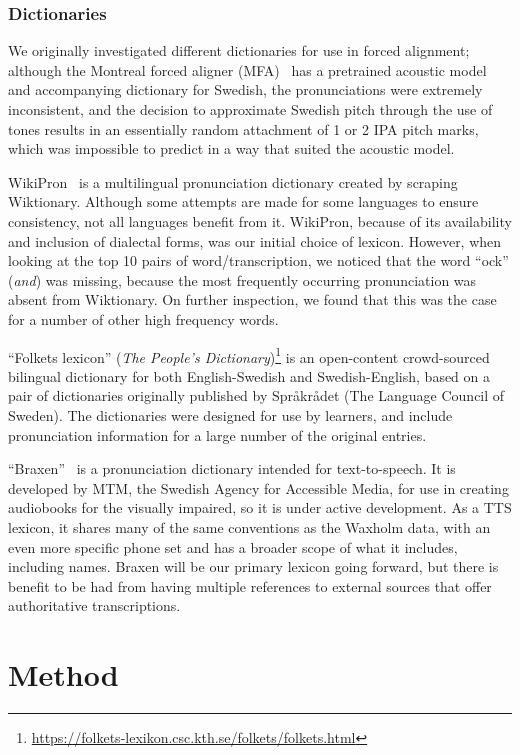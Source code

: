\documentclass{Interspeech}
\begin{document}
\subsubsection{Dictionaries}

We originally investigated different dictionaries for use in forced alignment; although the Montreal forced aligner (MFA)~\cite{mcauliffe17_interspeech} has a pretrained acoustic model and accompanying dictionary for Swedish, the pronunciations were extremely inconsistent, and the decision to approximate Swedish pitch through the use of tones results in an essentially random attachment of 1 or 2 IPA pitch marks, which was impossible to predict in a way that suited the acoustic model.

WikiPron~\cite{lee-etal-2020-massively} is a multilingual pronunciation dictionary created by scraping Wiktionary. Although some attempts are made for some languages to ensure consistency, not all languages benefit from it. WikiPron, because of its availability and inclusion of dialectal forms, was our initial choice of lexicon. However, when looking at the top 10 pairs of word/transcription, we noticed that the word ``ock'' (\textit{and}) was missing, because the most frequently occurring pronunciation was absent from Wiktionary. On further inspection, we found that this was the case for a number of other high frequency words.

``Folkets lexicon'' (\textit{The People's Dictionary})\footnote{\url{https://folkets-lexikon.csc.kth.se/folkets/folkets.html}} is an open-content crowd-sourced bilingual dictionary for both English-Swedish and Swedish-English, based on a pair of dictionaries originally published by Språkrådet (The Language Council of Sweden). The dictionaries were designed for use by learners, and include pronunciation information for a large number of the original entries.

``Braxen''~\cite{tannander2025braxen} is a pronunciation dictionary intended for text-to-speech. It is developed by MTM, the Swedish Agency for Accessible Media, for use in creating audiobooks for the visually impaired, so it is under active development. As a TTS lexicon, it shares many of the same conventions as the Waxholm data, with an even more specific phone set and has a broader scope of what it includes, including names. Braxen will be our primary lexicon going forward, but there is benefit to be had from having multiple references to external sources that offer authoritative transcriptions.

\section{Method}
\end{document}
